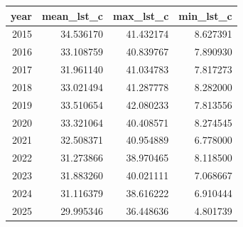 \begin{tabular}{rrrr}
\toprule
year & mean\_lst\_c & max\_lst\_c & min\_lst\_c \\
\midrule
2015 & 34.536170 & 41.432174 & 8.627391 \\
2016 & 33.108759 & 40.839767 & 7.890930 \\
2017 & 31.961140 & 41.034783 & 7.817273 \\
2018 & 33.021494 & 41.287778 & 8.282000 \\
2019 & 33.510654 & 42.080233 & 7.813556 \\
2020 & 33.321064 & 40.408571 & 8.274545 \\
2021 & 32.508371 & 40.954889 & 6.778000 \\
2022 & 31.273866 & 38.970465 & 8.118500 \\
2023 & 31.883260 & 40.021111 & 7.068667 \\
2024 & 31.116379 & 38.616222 & 6.910444 \\
2025 & 29.995346 & 36.448636 & 4.801739 \\
\bottomrule
\end{tabular}
